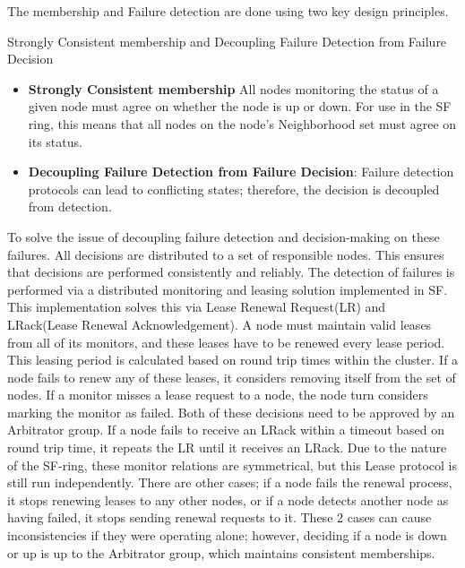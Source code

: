 \documentclass[a4paper,10pt,titlepage]{report}
\begin{document}
    The membership and Failure detection are done using two key design principles.\\
    \vspace{5mm}

    Strongly Consistent membership and Decoupling Failure Detection from Failure Decision\\
    \vspace{5mm}

    \begin{itemize}
        \item \textbf{Strongly Consistent membership} All nodes monitoring the status of a given node must agree on whether the node is up or down. For use in the SF ring, this means that all nodes on the node's Neighborhood set must agree on its status.
        \item \textbf{Decoupling Failure Detection from Failure Decision}: Failure detection protocols can lead to conflicting states; therefore, the decision is decoupled from detection.
    \end{itemize}
    \vspace{5mm}

    To solve the issue of decoupling failure detection and decision-making on these failures. All decisions are distributed to a set of responsible nodes. This ensures that decisions are performed consistently and reliably. The detection of failures is performed via a distributed monitoring and leasing solution implemented in SF. This implementation solves this via Lease Renewal Request(LR) and LRack(Lease Renewal Acknowledgement). A node must maintain valid leases from all of its monitors, and these leases have to be renewed every lease period. This leasing period is calculated based on round trip times within the cluster. If a node fails to renew any of these leases, it considers removing itself from the set of nodes. If a monitor misses a lease request to a node, the node turn considers marking the monitor as failed. Both of these decisions need to be approved by an Arbitrator group. If a node fails to receive an LRack within a timeout based on round trip time, it repeats the LR until it receives an LRack. Due to the nature of the SF-ring, these monitor relations are symmetrical, but this Lease protocol is still run independently. There are other cases; if a node fails the renewal process, it stops renewing leases to any other nodes, or if a node detects another node as having failed, it stops sending renewal requests to it. These 2 cases can cause inconsistencies if they were operating alone; however, deciding if a node is down or up is up to the Arbitrator group, which maintains consistent memberships. \\
    \vspace{5mm}
\end{document}
